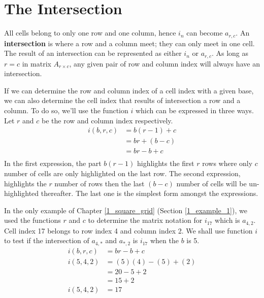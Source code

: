 \documentclass[letterpaper, twoside,12pt]{book}
\begin{document}
    \newpage

    \chapter{The Intersection} \label{intersection}
    All cells belong to only one row and one column, hence $i_n$ can become $a_{r,c}$. An \textbf{intersection} is where a row and a column meet; they can only meet in one cell. The result of an intersection can be represented as either $i_n$ or $a_{r,c}$. As long as $r=c$ in matrix $A_{r \times c}$, any given pair of row and column index will always have an intersection.

    If we can determine the row and column index of a cell index with a given base, we can also determine the cell index that results of intersection a row and a column. To do so, we'll use the function $i$ which can be expressed in three ways. Let $r$ and $c$ be the row and column index respectively.
    \begin{equation}
        \begin{split}
            i(b,r,c) &= b(r-1) + c \\
                    &= br + (b - c) \\
                    &= br - b + c \\
        \end{split}
    \end{equation}
    In the first expression, the part $b(r-1)$ highlights the first $r$ rows where only $c$ number of cells are only highlighted on the last row. The second expression, highlights the $r$ number of rows then the last $(b - c)$ number of cells will be un-highlighted thereafter. The last one is the simplest form amongst the expressions.

    In the only example of Chapter \ref{1_square_grid} (Section \ref{1_example_1}), we used the functions $r$ and $c$ to determine the matrix notation for $i_{17}$ which is $a_{4,2}$. Cell index 17 belongs to row index 4 and column index 2. We shall use function $i$ to test if the intersection of $a_{4,*}$ and $a_{*,2}$ is $i_{17}$ when the $b$ is 5.
    \begin{equation*}
        \begin{split}
            i(b,r,c) &= br - b + c \\
            i(5,4,2) &= (5)(4) - (5) + (2) \\
                &= 20 - 5 + 2 \\
                &= 15 + 2 \\
            i(5,4,2) &= 17
        \end{split}
    \end{equation*}
\end{document}
